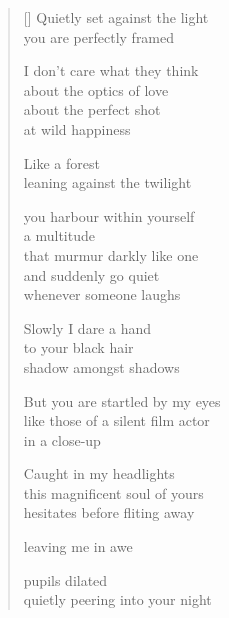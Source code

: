 \documentclass[12pt,a4paper]{article}
\begin{document}
\begin{verse}[\versewidth]
  Quietly set against the light \\
  you are perfectly framed

  I don't care what they think \\
  about the optics of love \\
  about the perfect shot \\
  at wild happiness

  Like a forest \\
  leaning against the twilight

  you harbour within yourself \\
  a multitude \\
  that murmur darkly like one \\
  and suddenly go quiet \\
  whenever someone laughs

  Slowly I dare a hand \\
  to your black hair \\
  shadow amongst shadows

  But you are startled by my eyes \\
  like those of a silent film actor \\
  in a close-up

  Caught in my headlights \\
  this magnificent soul of yours \\
  hesitates before fliting away

  leaving me in awe

  pupils dilated \\
  quietly peering into your night
\end{verse}


\newpage

\poemtitle{}

\settowidth{\versewidth}{yet better off than broken up}

\bigskip
\end{document}
